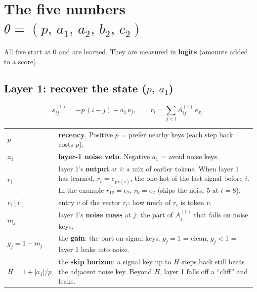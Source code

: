 \documentclass[11pt]{article}
\newcommand{\1}{\mathbf{1}}
\begin{document}
\section{The five numbers $\theta=(p,\,a_1,\,a_2,\,b_2,\,c_2)$}
All five start at $0$ and are learned. They are measured in \textbf{logits} (amounts added to a score).

\subsection*{Layer 1: recover the state ($p$, $a_1$)}
\[
s^{(1)}_{ij}=-p\,(i-j)+a_1\,\nu_j,\qquad r_i=\sum_{j<i}A^{(1)}_{ij}\,e_{x_j}.
\]
\begin{center}
\begin{tabular}{>{\raggedright}p{2.6cm}p{11.8cm}}
\toprule
$p$ & \textbf{recency}. Positive $p$ = prefer nearby keys (each step back costs $p$).\\
$a_1$ & \textbf{layer-1 noise veto}. Negative $a_1$ = avoid noise keys.\\
$r_i$ & layer 1's \textbf{output} at $i$: a mix of earlier tokens. When layer 1 has learned, $r_i=e_{\mathrm{pv}(i)}$, the one-hot of the last signal before $i$. In the example $r_{12}=e_2$, $r_9=e_2$ (skips the noise 5 at $t=8$).\\
$r_i[v]$ & entry $v$ of the vector $r_i$: how much of $r_i$ is token $v$.\\
$m_j$ & layer 1's \textbf{noise mass} at $j$: the part of $A^{(1)}_j$ that falls on noise keys.\\
$g_j=1-m_j$ & the \textbf{gain}: the part on signal keys. $g_j=1$ = clean, $g_j<1$ = layer 1 leaks into noise.\\
$H=1+|a_1|/p$ & the \textbf{skip horizon}: a signal key up to $H$ steps back still beats the adjacent noise key. Beyond $H$, layer 1 falls off a ``cliff'' and leaks.\\
\bottomrule
\end{tabular}
\end{center}
\end{document}
